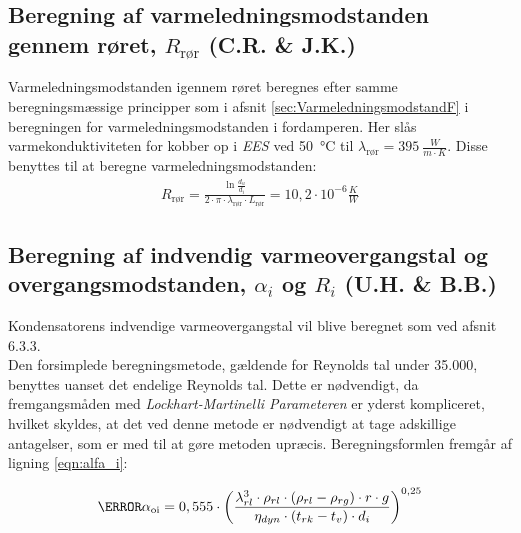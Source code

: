 \documentclass[../Hovedrapport.tex]{subfiles}
\begin{document}
\subsection{Beregning af varmeledningsmodstanden gennem røret, $R_\text{rør}$ (C.R. \& J.K.)}
Varmeledningsmodstanden igennem røret beregnes efter samme beregningsmæssige principper som i afsnit \ref{sec:VarmeledningsmodstandF} i beregningen for varmeledningsmodstanden i fordamperen. Her slås varmekonduktiviteten for kobber op i \textit{EES} ved \SI{50}{\celsius} til $\lambda_{\text{rør}} = \SI{395}{\frac{W}{m\cdot K}}$. Disse benyttes til at beregne varmeledningsmodstanden:
\begin{align}
R_\text{rør} = \frac{\ln{\frac{d_u}{d_i}}}{2 \cdot \pi \cdot \lambda_{\text{rør}} \cdot L_\text{rør}} = 10,2 \cdot 10^{-6} \si{\frac{K}{W}}
\end{align}

\subsection{Beregning af indvendig varmeovergangstal og overgangsmodstanden, $\alpha_i$ og $R_i$ (U.H. \& B.B.)}
Kondensatorens indvendige varmeovergangstal vil blive beregnet som ved \citep{koleteknik} afsnit 6.3.3. \\
Den forsimplede beregningsmetode, gældende for Reynolds tal under 35.000, benyttes uanset det endelige Reynolds tal. Dette er nødvendigt, da fremgangsmåden med \textit{Lockhart-Martinelli Parameteren} er yderst kompliceret, hvilket skyldes, at det ved denne metode er nødvendigt at tage adskillige antagelser, som er med til at gøre metoden upræcis. Beregningsformlen fremgår af ligning \ref{eqn:alfa_i}:

\begin{equation}
\label{eqn:alfa_i}
\V{\alpha}_\text{oi}   = 0,555\cdot  \left( \frac {\lambda_{rl}^{3}\cdot \rho_{rl}\cdot  \left( \rho_{rl}-\rho_{rg} \right) \cdot r\cdot g}{\eta_{dyn} \cdot  \left( t_{rk}-t_{v} \right) \cdot d_{i} } \right) ^{0,25}	 
\end{equation}
\end{document}
